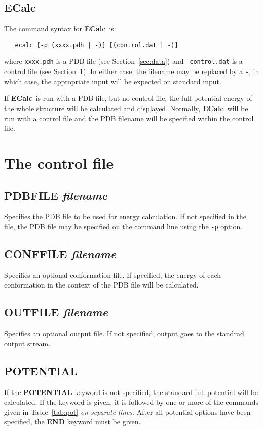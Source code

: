 \documentclass[12pt]{article}
\newcommand{\ecalc}{\mbox{\bf ECalc}}
\begin{document}
\subsection{ECalc}
The command syntax for \ecalc\ is:
\begin{verbatim}
   ecalc [-p (xxxx.pdh | -)] [(control.dat | -)]
\end{verbatim}
where {\tt xxxx.pdh} is a PDB file (see Section~\ref{sec:data}) and {\tt
control.dat} is a control file (see Section~\ref{sec:control}). In
either case, the filename may be replaced by a {\tt -}, in which case,
the appropriate input will be expected on standard input.

If \ecalc\ is run with a PDB file, but no control file, the
full-potential energy of the whole structure will be calculated and
displayed. Normally, \ecalc\ will be run with a control file and the
PDB filename will be specified within the control file.


\section{The control file}
\label{sec:control}

\subsection{PDBFILE  {\em filename}}
Specifies the PDB file to be used for energy calculation. If not
specified in the file, the PDB file may be specified on the command
line using the {\tt -p} option.

\subsection{CONFFILE {\em filename}}
Specifies an optional conformation file. If specified, the energy of
each conformation in the context of the PDB file will be calculated.

\subsection{OUTFILE  {\em filename}}
Specifies an optional output file. If not specified, output goes to
the standrad output stream.

\subsection{POTENTIAL}
If the {\bf POTENTIAL} keyword is not specified, the standard full
potential will be calculated. If the keyword is given, it is followed
by one or more of the commands given in Table~\ref{tab:pot} {\em on
separate lines}. After all potential options have been specified, the 
{\bf END} keyword must be given. 
\end{document}
